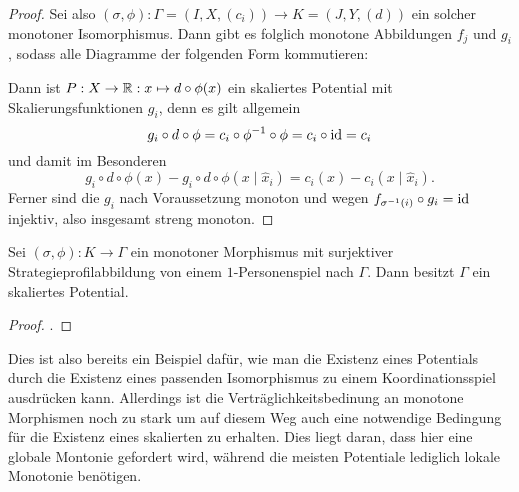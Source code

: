 \begin{proof}
	Sei also $(\sigma, \phi): \Gamma =(I, X, (c_i)) \to K = (J, Y, (d))$ ein solcher monotoner Isomorphismus. Dann gibt es folglich monotone Abbildungen $f_j$ und $g_i$, sodass alle Diagramme der folgenden Form kommutieren:
	
	\begin{center}
	\end{center}

	Dann ist $P: X \to \mathbb{R}: x \mapsto d \circ \phi(x)$ ein skaliertes Potential mit Skalierungsfunktionen $g_i$, denn es gilt allgemein
		\[g_i \circ d \circ \phi = c_i \circ \phi^{-1} \circ \phi = c_i \circ \mathrm{id} = c_i \]
	und damit im Besonderen
		\[g_i \circ d \circ \phi(x) - g_i \circ d \circ \phi(x \mid \hat{x}_i) = c_i(x) - c_i(x \mid \hat{x}_i) .\]
	Ferner sind die $g_i$ nach Voraussetzung monoton und wegen $f_{\sigma^{-1}(i)} \circ g_i = \mathrm{id}$ injektiv, also insgesamt streng monoton.
\end{proof}

\begin{kor}
	Sei $(\sigma, \phi): K \to \Gamma$ ein monotoner Morphismus mit surjektiver Strategieprofilabbildung von einem $1$-Personenspiel nach $\Gamma$. Dann besitzt $\Gamma$ ein skaliertes Potential.
\end{kor}

\begin{proof}.
	
\end{proof}

Dies ist also bereits ein Beispiel dafür, wie man die Existenz eines Potentials durch die Existenz eines passenden Isomorphismus zu einem Koordinationsspiel ausdrücken kann. Allerdings ist die Verträglichkeitsbedinung an monotone Morphismen noch zu stark um auf diesem Weg auch eine notwendige Bedingung für die Existenz eines skalierten zu erhalten. Dies liegt daran, dass hier eine globale Montonie gefordert wird, während die meisten Potentiale lediglich lokale Monotonie benötigen.

